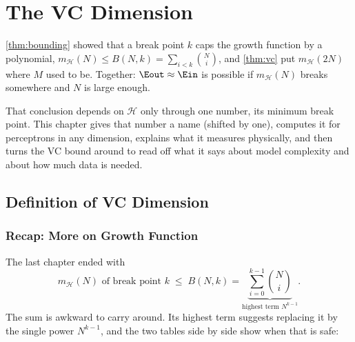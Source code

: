 \chapter{The VC Dimension}

\begin{prev}
    \autoref{thm:bounding} showed that a break point \(k\) caps the growth
    function by a polynomial, \(m_{\mathcal{H}}(N) \le B(N, k) =
    \sum_{i<k} \binom{N}{i}\), and \autoref{thm:vc} put \(m_{\mathcal{H}}(2N)\)
    where \(M\) used to be. Together: \(\Eout \approx \Ein\) is possible if
    \(m_{\mathcal{H}}(N)\) breaks somewhere and \(N\) is large enough.
\end{prev}

That conclusion depends on \(\mathcal{H}\) only through one number, its minimum
break point. This chapter gives that number a name (shifted by one), computes it
for perceptrons in any dimension, explains what it measures physically, and
then turns the VC bound around to read off what it says about model complexity
and about how much data is needed.

\section{Definition of VC Dimension}\label{sec:vc-def}


\subsection{Recap: More on Growth Function}

The last chapter ended with
\[
    m_{\mathcal{H}}(N) \text{ of break point } k
    \;\le\; B(N, k) = \underbrace{\sum_{i=0}^{k-1} \binom{N}{i}}_{\text{highest
    term } N^{k-1}} .
\]
The sum is awkward to carry around. Its highest term suggests replacing it by
the single power \(N^{k-1}\), and the two tables side by side show when that is
safe:

